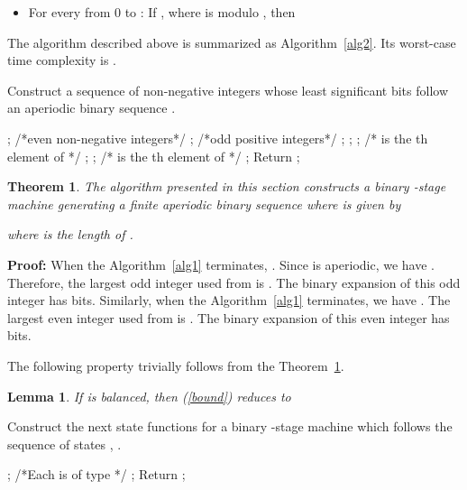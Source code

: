 \documentclass[twocolumn]{IEEEtran} \usepackage{epsfig}
\newtheorem{lemma}{Lemma}
\newtheorem{theorem}{Theorem}
\begin{document}
\begin{itemize}
\item[]
For every  from 0 to : If , where  is modulo , then 

\end{itemize}

The algorithm described above is summarized as Algorithm~\ref{alg2}.
Its worst-case time complexity is .

\begin{algorithm}[t]
\caption{Construct a sequence of non-negative integers whose least significant bits
follow an aperiodic binary sequence .}
\label{alg1}
\begin{algorithmic}[1]
\STATE ; /*even non-negative integers*/
\STATE ; /*odd positive integers*/
\STATE ;
\STATE ;
\IF{}
\STATE ; /* is the th element of  */
\STATE ;
\ELSE
\STATE ; /* is the th element of  */
\STATE ;
\ENDIF
\ENDFOR
\STATE Return ;
\end{algorithmic}
\end{algorithm}

\begin{theorem} \label{th1}
The algorithm presented in this section constructs a binary -stage machine 
generating a finite aperiodic binary sequence  where  is given by

where  is the length of .
\end{theorem}
{\bf Proof:}  
When the Algorithm~\ref{alg1} terminates, .
Since  is aperiodic, we have .
Therefore,  the largest odd integer used from  is .
The binary expansion of this odd integer has  bits.
Similarly, when the Algorithm~\ref{alg1} terminates, we have .
The largest even integer used from  is .
The binary expansion of this even integer has  bits.
\begin{flushright}

\end{flushright}

The following property trivially follows from the Theorem~\ref{th1}.

\begin{lemma} 
If  is balanced, then (\ref{bound}) reduces to

\end{lemma} 

\begin{algorithm}[t!]
\caption{Construct the next state functions for a binary -stage machine
which follows the sequence of states , .}
\label{alg2}
\begin{algorithmic}[1]
\STATE ;
\ENDFOR
{}
\STATE /*Each  is of type */
\IF{} 
\STATE ;
\ENDIF
\ENDFOR
\ENDFOR
\STATE Return ;
\end{algorithmic}
\end{algorithm}
\end{document}
